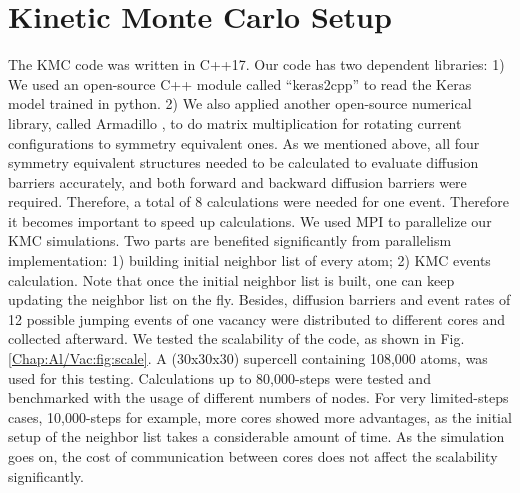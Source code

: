 \newpage
\section{Kinetic Monte Carlo Setup}
\label{Chap:Al/Vac:section:KMC}


The \ac{KMC} code was written in C++17. \cite{Zhang2020KNN2} Our code has two dependent libraries: 1) We used an open-source C++ module called ``keras2cpp'' to read the Keras model trained in python. \cite{Perevozchikov2019} 2) We also applied another open-source numerical library, called Armadillo \cite{sanderson2016armadillo, sanderson2018user}, to do matrix multiplication for rotating current configurations to symmetry equivalent ones. As we mentioned above, all four symmetry equivalent structures needed to be calculated to evaluate diffusion barriers accurately, and both forward and backward diffusion barriers were required. Therefore, a total of 8 calculations were needed for one event. Therefore it becomes important to speed up calculations. We used \ac{MPI} to parallelize our \ac{KMC} simulations. Two parts are benefited significantly from parallelism implementation: 1) building initial neighbor list of every atom; 2) \ac{KMC} events calculation. Note that once the initial neighbor list is built, one can keep updating the neighbor list on the fly. Besides, diffusion barriers and event rates of 12 possible jumping events of one vacancy were distributed to different cores and collected afterward. We tested the scalability of the code, as shown in Fig. \ref{Chap:Al/Vac:fig:scale}. A (30x30x30) supercell containing 108,000 atoms, was used for this testing. Calculations up to 80,000-steps were tested and benchmarked with the usage of different numbers of nodes. For very limited-steps cases, 10,000-steps for example, more cores showed more advantages, as the initial setup of the neighbor list takes a considerable amount of time. As the simulation goes on, the cost of communication between cores does not affect the scalability significantly.


